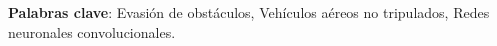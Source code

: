 \begin{titlepage}
{}

\noindent \begin{small} \textbf{Palabras clave}: Evasión de obstáculos, Vehículos aéreos no tripulados, Redes neuronales convolucionales. \end{small}


\end{titlepage}
